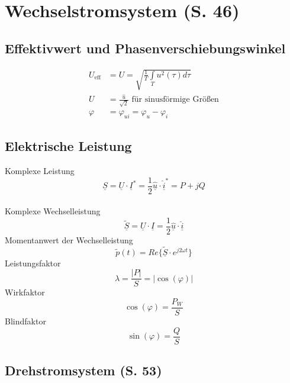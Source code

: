 \documentclass[a4paper,twocolumn,10pt]{article}
\begin{document}
\section{Wechselstromsystem (S. 46)}

\subsection{Effektivwert und Phasenverschiebungswinkel}
\begin{equation*}
\begin{split}
U_{\text{eff}}&=U=\sqrt{\frac{1}{T}\int\limits_Tu^2(\tau)d\tau}\\
U&=\frac{\hat{u}}{\sqrt{2}}\text{ für sinusförmige Größen}\\
\varphi&=\varphi_{ui}=\varphi_u-\varphi_i
\end{split}
\end{equation*}

\subsection{Elektrische Leistung}
Komplexe Leistung
\begin{equation*}
\underline{S}=\underline{U}\cdot\underline{I}^*=\frac{1}{2}\underline{\hat{u}}\cdot\underline{\hat{i}}^*=P+jQ
\end{equation*}
\\
Komplexe Wechselleistung
\begin{equation*}
\underline{\tilde{S}}=\underline{U}\cdot\underline{I}=\frac{1}{2}\underline{\hat{u}}\cdot\underline{\hat{i}}
\end{equation*}
Momentanwert der Wechselleistung
\begin{equation*}
\tilde{p}(t)=Re\{\tilde{\underline{S}}\cdot e^{j2\omega t}\}
\end{equation*}
Leistungsfaktor
\begin{equation*}
\lambda=\frac{|P|}{S}=|\cos(\varphi)|
\end{equation*}
Wirkfaktor
\begin{equation*}
\cos(\varphi)=\frac{P_W}{S}
\end{equation*}
Blindfaktor
\begin{equation*}
\sin(\varphi)=\frac{Q}{S}
\end{equation*}

\subsection{Drehstromsystem (S. 53)}
\end{document}
